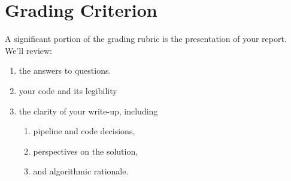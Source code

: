 \documentclass[paper=a4, fontsize=11pt]{scrartcl} %
\begin{document}
\section{Grading Criterion}

A significant portion of the grading rubric is the presentation of your report. We'll review:

\begin{enumerate}
    \item the answers to questions.
    \item your code and its legibility
    \item the clarity of your write-up, including 
    \begin{enumerate}
      \item pipeline and code decisions, 
      \item perspectives on the solution, 
      \item and algorithmic rationale.
    \end{enumerate}
\end{enumerate}
\end{document}
